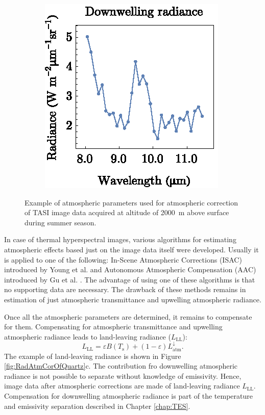 \begin{figure}[htb]
	\hspace{1em}
	\begin{subfigure}[t]{.3\linewidth}
		\centering
		\includegraphics[scale=1]{pics/Chapter_02/Downwelling.eps}
		\vspace{-0.4cm}
		\caption{}
	\end{subfigure}
	\vspace{1.5 em}
	\caption{Example of atmospheric parameters used for atmospheric correction of TASI image data acquired at altitude of \SI{2000}{\meter} above surface during summer season.}
	\label{fig:AtmParams}
\end{figure}

In case of thermal hyperspectral images, various algorithms for estimating atmospheric effects based just on the image data itself were developed. Usually it is applied to one of the following: In-Scene Atmospheric Corrections (ISAC) introduced by Young et al. \cite{Y02} and Autonomous Atmospheric Compensation (AAC) introduced by Gu et al. \cite{GG00}. The advantage of using one of these algorithms is that no supporting data are necessary. The drawback of these methods remains in estimation of just atmospheric transmittance and upwelling atmospheric radiance.

Once all the atmospheric parameters are determined, it remains to compensate for them. Compensating for atmospheric transmittance and upwelling atmospheric radiance leads to land-leaving radiance ($L_\mathrm{LL}$):
\begin{equation}
\label{eq:landleavingRadiance}
L_\mathrm{LL} = \varepsilon B(T_\mathrm{s}) + (1 - \varepsilon) L^\downarrow_\mathrm{atm}.
\end{equation}
The example of land-leaving radiance is shown in Figure \ref{fig:RadAtmCorOfQuartz}c. The contribution fro downwelling atmospheric radiance is not possible to separate without knowledge of emissivity. Hence, image data after atmospheric corrections are made of land-leaving radiance $L_\mathrm{LL}$. Compensation for downwelling atmospheric radiance is part of the temperature and emissivity separation described in Chapter \ref{chap:TES}.

